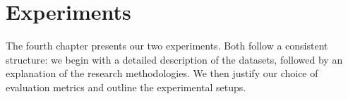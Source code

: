 \chapter{Experiments}
\label{chap:exp}

The fourth chapter presents our two experiments. Both follow a consistent structure: we begin with a detailed description of the datasets, followed by an explanation of the research methodologies. We then justify our choice of evaluation metrics and outline the experimental setups.




